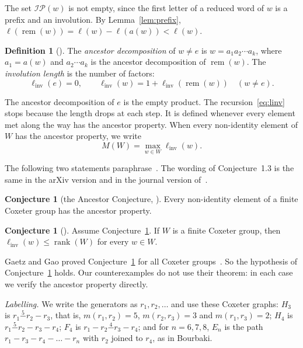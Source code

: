 \documentclass[11pt]{amsart}
\theoremstyle{definition}\newtheorem{definition}[theorem]{Definition}
\newtheorem{conjecture}[theorem]{Conjecture}
\theoremstyle{remark}\newtheorem{remark}[theorem]{Remark}
\newcommand{\linv}{\ell_{\mathrm{inv}}}
\newcommand{\IP}{\mathcal{IP}}
\DeclareMathOperator{\rem}{rem}
\DeclareMathOperator{\rank}{rank}
\begin{document}
The set \(\IP(w)\) is not empty, since the first letter of a reduced word of \(w\) is a prefix and an involution. By Lemma~\ref{lem:prefix}, \(\ell(\rem(w))=\ell(w)-\ell(a(w))<\ell(w)\).

\begin{definition}[{\cite[\S1]{HR}}]\label{def:linv}
The \emph{ancestor decomposition} of \(w\neq e\) is \(w=a_1a_2\cdots a_k\), where \(a_1=a(w)\) and \(a_2\cdots a_k\) is the ancestor decomposition of \(\rem(w)\). The \emph{involution length} is the number of factors:
\begin{equation}\label{eq:linv}
\linv(e)=0,\qquad \linv(w)=1+\linv(\rem(w))\quad (w\neq e).
\end{equation}
\end{definition}

The ancestor decomposition of \(e\) is the empty product. The recursion~\eqref{eq:linv} stops because the length drops at each step. It is defined whenever every element met along the way has the ancestor property. When every non-identity element of \(W\) has the ancestor property, we write
\begin{equation}\label{eq:M}
M(W)=\max_{w\in W}\linv(w).
\end{equation}

The following two statements paraphrase~\cite{HR}. The wording of Conjecture~1.3 is the same in the arXiv version and in the journal version of~\cite{HR}.

\begin{conjecture}[{the Ancestor Conjecture, \cite[Conj.~1.2]{HR}}]\label{conj:ancestor}
Every non-identity element of a finite Coxeter group has the ancestor property.
\end{conjecture}

\begin{conjecture}[{\cite[Conj.~1.3]{HR}}]\label{conj:rank}
Assume Conjecture~\ref{conj:ancestor}. If \(W\) is a finite Coxeter group, then \(\linv(w)\le\rank(W)\) for every \(w\in W\).
\end{conjecture}

Gaetz and Gao proved Conjecture~\ref{conj:ancestor} for all Coxeter groups~\cite[Cor.~1.2]{GG}. So the hypothesis of Conjecture~\ref{conj:rank} holds. Our counterexamples do not use their theorem: in each case we verify the ancestor property directly.

\emph{Labelling.} We write the generators as \(r_1,r_2,\dots\) and use these Coxeter graphs: \(H_3\) is \(r_1\overset{5}{-}r_2-r_3\), that is, \(m(r_1,r_2)=5\), \(m(r_2,r_3)=3\) and \(m(r_1,r_3)=2\); \(H_4\) is \(r_1\overset{5}{-}r_2-r_3-r_4\); \(F_4\) is \(r_1-r_2\overset{4}{-}r_3-r_4\); and for \(n=6,7,8\), \(E_n\) is the path \(r_1-r_3-r_4-\dots-r_n\) with \(r_2\) joined to \(r_4\), as in Bourbaki.
\end{document}
